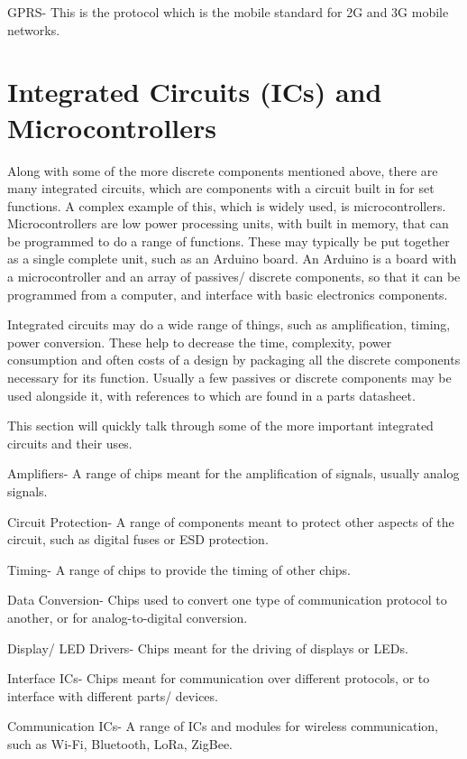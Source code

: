 \documentclass[a4paper,11pt]{report}
\begin{document}
GPRS- This is the protocol which is the mobile standard for 2G and 3G mobile networks.

\section{Integrated Circuits (ICs) and Microcontrollers}

Along with some of the more discrete components mentioned above, there are many integrated circuits, which are components with a circuit built in for set functions. A complex example of this, which is widely used, is microcontrollers. Microcontrollers are low power processing units, with built in memory, that can be programmed to do a range of functions. These may typically be put together as a single complete unit, such as an Arduino board. An Arduino is a board with a microcontroller and an array of passives/ discrete components, so that it can be programmed from a computer, and interface with basic electronics components.

Integrated circuits may do a wide range of things, such as amplification, timing, power conversion. These help to decrease the time, complexity, power consumption and often costs of a design by packaging all the discrete components necessary for its function. Usually a few passives or discrete components may be used alongside it, with references to which are found in a parts datasheet.

This section will quickly talk through some of the more important integrated circuits and their uses.

Amplifiers- A range of chips meant for the amplification of signals, usually analog signals.

Circuit Protection- A range of components meant to protect other aspects of the circuit, such as digital fuses or ESD protection.

Timing- A range of chips to provide the timing of other chips.

Data Conversion- Chips used to convert one type of communication protocol to another, or for analog-to-digital conversion.

Display/ LED Drivers- Chips meant for the driving of displays or LEDs.

Interface ICs- Chips meant for communication over different protocols, or to interface with different parts/ devices.

Communication ICs- A range of ICs and modules for wireless communication, such as Wi-Fi, Bluetooth, LoRa, ZigBee.
\end{document}
